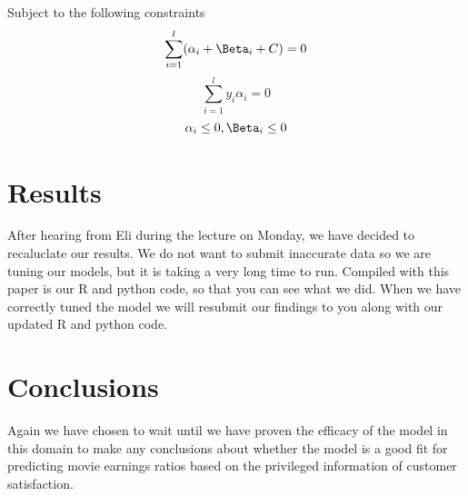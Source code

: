 \documentclass[twoside]{article}\usepackage[]{graphicx}\usepackage[]{color}
\begin{document}
\begin{multicols}{2}
Subject to the following constraints
\[
  \sum\limits^l_{i=1}(\alpha_i + \Beta_i + C) = 0 
\]
\[
  \sum\limits^l_{i=1}y_i\alpha_i = 0
\]
\[
  \alpha_i \le 0, \Beta_i \le 0
\]



\section{Results}

After hearing from Eli during the lecture on Monday, we have decided to recaluclate
our results. We do not want to submit inaccurate data so we are tuning our models,
but it is taking a very long time to run. Compiled with this paper is our R and 
python code, so that you can see what we did. When we have correctly tuned the 
model we will resubmit our findings to you along with our updated R and python code.


\section{Conclusions}
Again we have chosen to wait until we have proven the efficacy of the model in this
domain to make any conclusions about whether the model is a good fit for predicting
movie earnings ratios based on the privileged information of customer satisfaction.

{}


\end{multicols}
\end{document}
